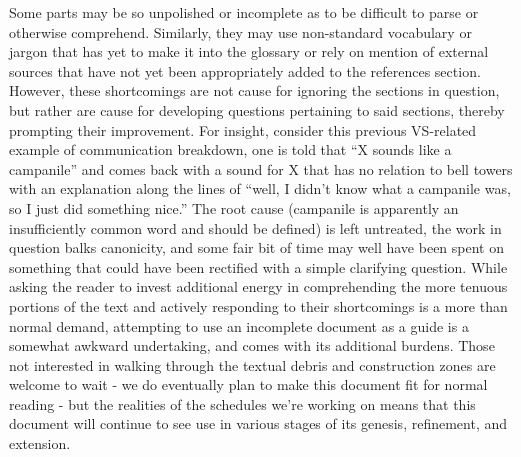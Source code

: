 Some parts may be so unpolished or incomplete as to be difficult to
parse or otherwise comprehend. Similarly, they may use non-standard
vocabulary or jargon that has yet to make it into the glossary or rely
on mention of external sources that have not yet been appropriately
added to the references section. However, these shortcomings are not
cause for ignoring the sections in question, but rather are cause for
developing questions pertaining to said sections, thereby prompting
their improvement. For insight, consider this previous VS-related
example of communication breakdown, one is told that ``X sounds like a
campanile'' and comes back with a sound for X that has no relation to
bell towers with an explanation along the lines of ``well, I didn't
know what a campanile was, so I just did something nice.'' The root
cause (campanile is apparently an insufficiently common word and
should be defined) is left untreated, the work in question balks
canonicity, and some fair bit of time may well have been spent on
something that could have been rectified with a simple clarifying
question. While asking the reader to invest additional energy in
comprehending the more tenuous portions of the text and actively
responding to their shortcomings is a more than normal demand,
attempting to use an incomplete document as a guide is a somewhat
awkward undertaking, and comes with its additional burdens. Those not
interested in walking through the textual debris and construction
zones are welcome to wait - we do eventually plan to make this
document fit for normal reading - but the realities of the schedules
we're working on means that this document will continue to see use in
various stages of its genesis, refinement, and extension.


